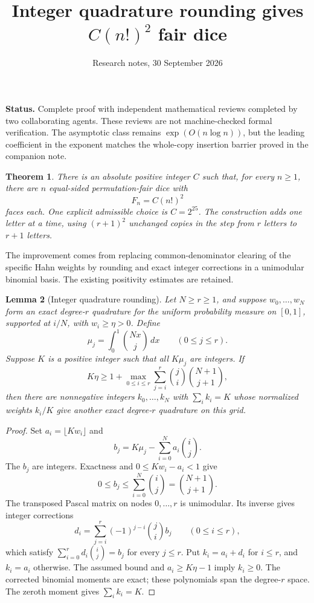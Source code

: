 \documentclass[11pt]{article}
\title{Integer quadrature rounding gives $C(n!)^2$ fair dice}
\author{Research notes, 30 September 2026}
\date{}
\newtheorem{theorem}{Theorem}
\newtheorem{lemma}[theorem]{Lemma}
\begin{document}
\maketitle
\noindent\textbf{Status.} Complete proof with independent mathematical reviews completed
by two collaborating agents. These reviews are not machine-checked formal
verification. The asymptotic class remains $\exp(O(n\log n))$, but the
leading coefficient in the exponent matches the whole-copy insertion
barrier proved in the companion note.

\begin{theorem}\label{thm:main}
There is an absolute positive integer $C$ such that, for every $n\ge1$,
there are $n$ equal-sided permutation-fair dice with
\[
 F_n=C(n!)^2
\]
faces each. One explicit admissible choice is $C=2^{25}$.
The construction adds one letter at a time, using $(r+1)^2$ unchanged
copies in the step from $r$ letters to $r+1$ letters.
\end{theorem}

The improvement comes from replacing common-denominator clearing of the
specific Hahn weights by rounding and exact integer corrections in a
unimodular binomial basis. The existing positivity estimates are retained.

\begin{lemma}[Integer quadrature rounding]\label{lem:round}
Let $N\ge r\ge1$, and suppose $w_0,\ldots,w_N$ form an exact degree-$r$
quadrature for the uniform probability measure on $[0,1]$, supported at
$i/N$, with $w_i\ge\eta>0$. Define
\[
 \mu_j=\int_0^1\binom{Nx}{j}\,dx\qquad(0\le j\le r).
\]
Suppose $K$ is a positive integer such that all $K\mu_j$ are integers.
If
\[
 K\eta\ge1+\max_{0\le i\le r}
       \sum_{j=i}^r\binom ji\binom{N+1}{j+1},
\]
then there are nonnegative integers $k_0,\ldots,k_N$ with
$\sum_i k_i=K$ whose normalized weights $k_i/K$ give another exact
degree-$r$ quadrature on this grid.
\end{lemma}
\begin{proof}
Set $a_i=\lfloor Kw_i\rfloor$ and
\[
 b_j=K\mu_j-\sum_{i=0}^Na_i\binom ij.
\]
The $b_j$ are integers. Exactness and $0\le Kw_i-a_i<1$ give
\[
 0\le b_j\le\sum_{i=0}^N\binom ij=\binom{N+1}{j+1}.
\]
The transposed Pascal matrix on nodes $0,\ldots,r$ is unimodular.
Its inverse gives integer corrections
\[
 d_i=\sum_{j=i}^r(-1)^{j-i}\binom ji b_j\qquad(0\le i\le r),
\]
which satisfy $\sum_{i=0}^r d_i\binom ij=b_j$ for every $j\le r$.
Put $k_i=a_i+d_i$ for $i\le r$, and $k_i=a_i$ otherwise.
The assumed bound and $a_i\ge K\eta-1$ imply $k_i\ge0$.
The corrected binomial moments are exact; these polynomials span the
degree-$r$ space. The zeroth moment gives $\sum_i k_i=K$.
\end{proof}
\end{document}
